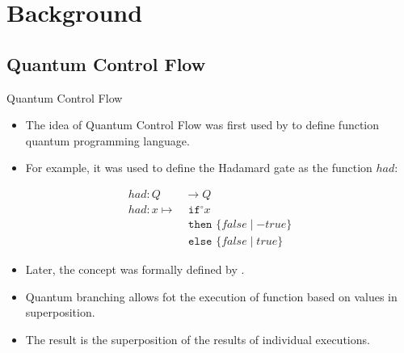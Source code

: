 \section{Background}
\subsection{Quantum Control Flow}
\begin{frame}{Quantum Control Flow}
    
    \begin{itemize}
        \item The idea of Quantum Control Flow was first used by \cite{AlGr05} to define function quantum programming language.
        \item For example, it was used to define the Hadamard gate as the function $had$:  
    \end{itemize}
    \begin{align*}
        had : Q& \to Q\\
        had : x \mapsto& \texttt{ if}^\circ x\\
                       & \texttt{ then } \{false \mid -true\}\\
                       & \texttt{ else } \{false \mid true\}
    \end{align*}
    \begin{itemize}
        \item Later, the concept was formally defined by \cite{YYF12}.
        \item Quantum branching allows fot the execution of function based on values in superposition.
        \item The result is the superposition of the results of individual executions.
    \end{itemize}
\end{frame}
